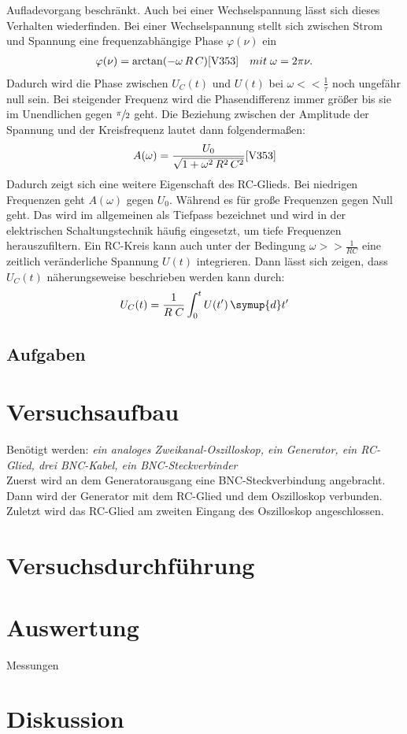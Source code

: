   Aufladevorgang beschränkt. Auch bei einer Wechselspannung lässt sich dieses 
  Verhalten wiederfinden. Bei einer Wechselspannung stellt sich zwischen Strom 
  und Spannung eine frequenzabhängige Phase $\varphi(\nu)$ ein
  \begin{align}
      \varphi(\nu)=\arctan (-\omega \, R\, C) \text{\cite{V353}} \quad mit \; \omega = 2 \pi \nu. \label{eq:nu}
  \end{align}
  Dadurch wird die Phase zwischen $U_C(t)$ und $U(t)$ bei $\omega << \frac{1}{\tau}$
  noch ungefähr null sein. Bei steigender Frequenz wird die Phasendifferenz immer größer
  bis sie im Unendlichen gegen $\sfrac{\pi}{2}$ geht.
  Die Beziehung zwischen der Amplitude der Spannung und der Kreisfrequenz lautet dann 
  folgendermaßen:
  \begin{align}
    A(\omega)= \frac{U_0}{\sqrt{1+\omega^2\, R^2\, C^2}} \text{\cite{V353}} \label{eq:A}
  \end{align}
  Dadurch zeigt sich eine weitere Eigenschaft des RC-Glieds. Bei niedrigen 
  Frequenzen geht $A(\omega)$ gegen $U_0$. Während es für große Frequenzen
  gegen Null geht.
  Das wird im allgemeinen als Tiefpass bezeichnet und  wird in der 
  elektrischen Schaltungstechnik häufig eingesetzt, um tiefe Frequenzen
  herauszufiltern.
  Ein RC-Kreis kann auch unter der Bedingung $\omega >> \frac{1}{RC}$ eine 
  zeitlich veränderliche Spannung $U(t)$ integrieren. Dann lässt sich 
  zeigen, dass $U_C(t)$ näherungseweise beschrieben werden kann durch:
  \begin{align}
    U_C(t)=\frac{1}{R\;C} \int_0^t{U(t')\, \symup{d}t'}
  \end{align}

\subsection{Aufgaben}




\section{Versuchsaufbau}
Benötigt werden: \textit{ein analoges Zweikanal-Oszilloskop, ein Generator, ein RC-Glied, drei BNC-Kabel, ein BNC-Steckverbinder }\\
Zuerst wird an dem Generatorausgang eine BNC-Steckverbindung angebracht. 
Dann wird der Generator mit dem RC-Glied und dem Oszilloskop verbunden. \\
Zuletzt wird das RC-Glied am zweiten Eingang des Oszilloskop angeschlossen.
\section{Versuchsdurchführung}

\section{Auswertung}

    \begin{table}
        \centering
        \caption{Messungen}
         
        \label{tab:data}
    \end{table}

\section{Diskussion}
\newpage
\nocite{V353}
\printbibliography
